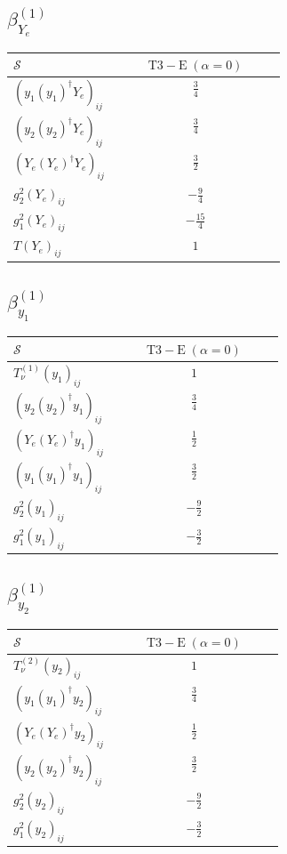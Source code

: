 \documentclass[9pt]{article}
\begin{document}
\subsection*{$ \beta_{Y_e}^{(1)} $}
\begin{longtable}{@{}p{0.38\linewidth}c@{}}
\toprule
$\mathcal{S}$ & $ \mathrm{T3-E}\;(\alpha=0) $ \\
\midrule
$ (y_1 (y_1)^{\dagger} Y_e)_{ij} $ & $ \frac{3}{4} $ \\
$ (y_2 (y_2)^{\dagger} Y_e)_{ij} $ & $ \frac{3}{4} $ \\
$ (Y_e (Y_e)^{\dagger} Y_e)_{ij} $ & $ \frac{3}{2} $ \\
$ g_2^2 (Y_e)_{ij} $ & $ - \frac{9}{4} $ \\
$ g_1^2 (Y_e)_{ij} $ & $ - \frac{15}{4} $ \\
$ T (Y_e)_{ij} $ & $ 1 $ \\
\bottomrule
\end{longtable}
\subsection*{$ \beta_{y_1}^{(1)} $}
\begin{longtable}{@{}p{0.38\linewidth}c@{}}
\toprule
$\mathcal{S}$ & $ \mathrm{T3-E}\;(\alpha=0) $ \\
\midrule
$ T_{\nu}^{(1)} (y_1)_{ij} $ & $ 1 $ \\
$ (y_2 (y_2)^{\dagger} y_1)_{ij} $ & $ \frac{3}{4} $ \\
$ (Y_e (Y_e)^{\dagger} y_1)_{ij} $ & $ \frac{1}{2} $ \\
$ (y_1 (y_1)^{\dagger} y_1)_{ij} $ & $ \frac{3}{2} $ \\
$ g_2^2 (y_1)_{ij} $ & $ - \frac{9}{2} $ \\
$ g_1^2 (y_1)_{ij} $ & $ - \frac{3}{2} $ \\
\bottomrule
\end{longtable}
\subsection*{$ \beta_{y_2}^{(1)} $}
\begin{longtable}{@{}p{0.38\linewidth}c@{}}
\toprule
$\mathcal{S}$ & $ \mathrm{T3-E}\;(\alpha=0) $ \\
\midrule
$ T_{\nu}^{(2)} (y_2)_{ij} $ & $ 1 $ \\
$ (y_1 (y_1)^{\dagger} y_2)_{ij} $ & $ \frac{3}{4} $ \\
$ (Y_e (Y_e)^{\dagger} y_2)_{ij} $ & $ \frac{1}{2} $ \\
$ (y_2 (y_2)^{\dagger} y_2)_{ij} $ & $ \frac{3}{2} $ \\
$ g_2^2 (y_2)_{ij} $ & $ - \frac{9}{2} $ \\
$ g_1^2 (y_2)_{ij} $ & $ - \frac{3}{2} $ \\
\bottomrule
\end{longtable}
\end{document}
